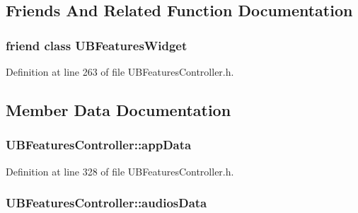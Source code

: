 \subsection{Friends And Related Function Documentation}
\hypertarget{class_u_b_features_controller_a0919cf48cd624319081a39cddeb338b5}{
\subsubsection[{U\-B\-Features\-Widget}]{\setlength{\rightskip}{0pt plus 5cm}friend class {\bf U\-B\-Features\-Widget}\hspace{0.3cm}{\ttfamily [friend]}}}\label{d8/d33/class_u_b_features_controller_a0919cf48cd624319081a39cddeb338b5}


Definition at line 263 of file U\-B\-Features\-Controller.\-h.



\subsection{Member Data Documentation}
\hypertarget{class_u_b_features_controller_ad275980ee495eceb548f281113b6eb54}{
\subsubsection[{app\-Data}]{ U\-B\-Features\-Controller\-::app\-Data}}\label{d8/d33/class_u_b_features_controller_ad275980ee495eceb548f281113b6eb54}


Definition at line 328 of file U\-B\-Features\-Controller.\-h.

\hypertarget{class_u_b_features_controller_a96885273da6eef4ead9cdd4134581e15}{
\subsubsection[{audios\-Data}]{ U\-B\-Features\-Controller\-::audios\-Data}}\label{d8/d33/class_u_b_features_controller_a96885273da6eef4ead9cdd4134581e15}


